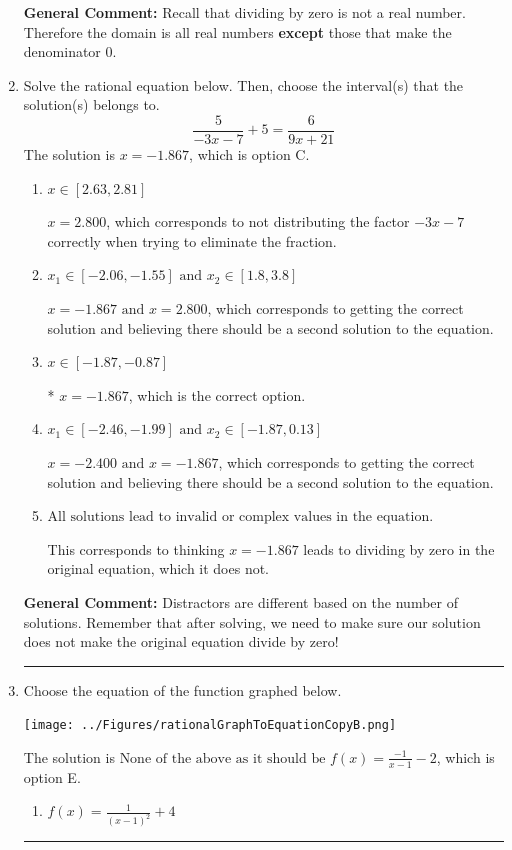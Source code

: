 \documentclass{extbook}[14pt]
\newcommand{\litem}[1]{\item #1

\rule{\textwidth}{0.4pt}}
\begin{document}
\begin{enumerate}
{\textbf{General Comment:} Recall that dividing by zero is not a real number. Therefore the domain is all real numbers \textbf{except} those that make the denominator 0.
}
\litem{
Solve the rational equation below. Then, choose the interval(s) that the solution(s) belongs to.
\[ \frac{5}{-3x -7} + 5 = \frac{6}{9x + 21} \]The solution is \( x = -1.867 \), which is option C.\begin{enumerate}[label=\Alph*.]
\item \( x \in [2.63,2.81] \)

$x = 2.800$, which corresponds to not distributing the factor $-3x -7$ correctly when trying to eliminate the fraction.
\item \( x_1 \in [-2.06, -1.55] \text{ and } x_2 \in [1.8,3.8] \)

$x = -1.867 \text{ and } x = 2.800$, which corresponds to getting the correct solution and believing there should be a second solution to the equation.
\item \( x \in [-1.87,-0.87] \)

* $x = -1.867$, which is the correct option.
\item \( x_1 \in [-2.46, -1.99] \text{ and } x_2 \in [-1.87,0.13] \)

$x = -2.400 \text{ and } x = -1.867$, which corresponds to getting the correct solution and believing there should be a second solution to the equation.
\item \( \text{All solutions lead to invalid or complex values in the equation.} \)

This corresponds to thinking $x = -1.867$ leads to dividing by zero in the original equation, which it does not.
\end{enumerate}

\textbf{General Comment:} Distractors are different based on the number of solutions. Remember that after solving, we need to make sure our solution does not make the original equation divide by zero!
}
\litem{
Choose the equation of the function graphed below.

\begin{center}
    \texttt{[image: ../Figures/rationalGraphToEquationCopyB.png]}
\end{center}


The solution is \( \text{None of the above as it should be } f(x) = \frac{-1}{x - 1} - 2 \), which is option E.\begin{enumerate}[label=\Alph*.]
\item \( f(x) = \frac{1}{(x - 1)^2} + 4 \)


\end{enumerate}}
\end{enumerate}
\end{document}
